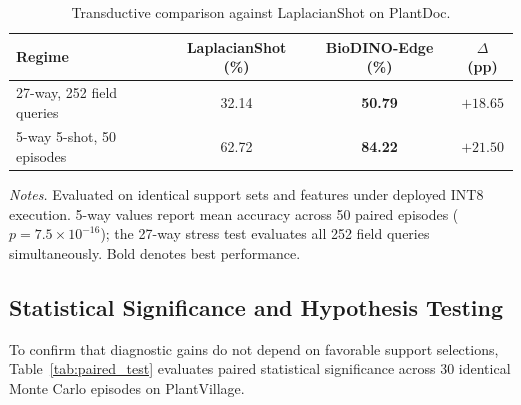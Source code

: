 \documentclass[preprint,12pt]{elsarticle}
\begin{document}
\begin{table}[htbp]
\caption{Transductive comparison against LaplacianShot on PlantDoc.}
\label{tab:plantdoc_laplacian}
\centering

\footnotesize
\setlength{\tabcolsep}{4pt}
\begin{tabular*}{\columnwidth}{@{\extracolsep{\fill}}lccc}
\toprule
\textbf{Regime} & \textbf{LaplacianShot (\%)} & \textbf{BioDINO-Edge (\%)} & \textbf{$\Delta$ (pp)} \\
\midrule
27-way, 252 field queries & 32.14 & \textbf{50.79} & $+18.65$ \\
5-way 5-shot, 50 episodes & 62.72 & \textbf{84.22} & $+21.50$ \\
\bottomrule
\end{tabular*}

\vspace{3pt}
\begin{minipage}{\columnwidth}
\footnotesize
\textit{Notes.} Evaluated on identical support sets and features under deployed INT8 execution. 5-way values report mean accuracy across 50 paired episodes ($p = 7.5 \times 10^{-16}$); the 27-way stress test evaluates all 252 field queries simultaneously. Bold denotes best performance.
\end{minipage}
\end{table}

\subsection{Statistical Significance and Hypothesis Testing}
\label{sec:significance}
\label{sec:transductive_validation}

To confirm that diagnostic gains do not depend on favorable support selections, Table~\ref{tab:paired_test} evaluates paired statistical significance across 30 identical Monte Carlo episodes on PlantVillage.
\end{document}
